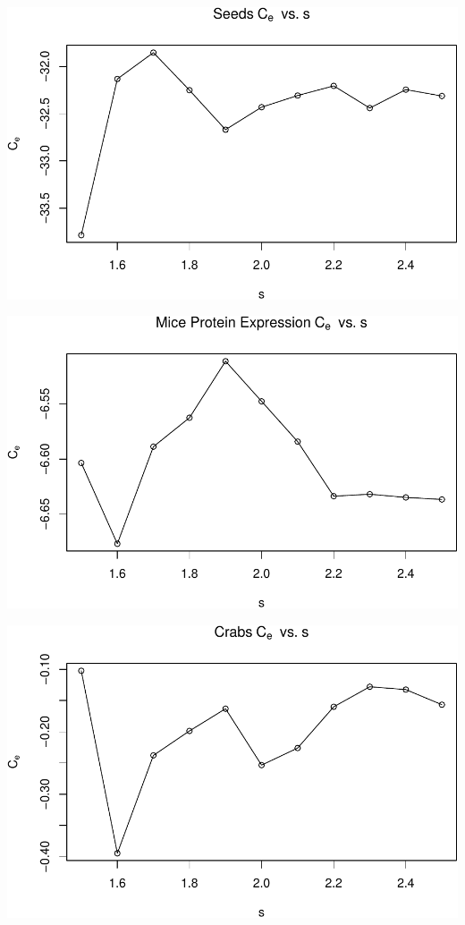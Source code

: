 \begin{center}\includegraphics[width=1\linewidth]{Report_files/figure-latex/unnamed-chunk-24-5} \end{center}

\begin{center}\includegraphics[width=1\linewidth]{Report_files/figure-latex/unnamed-chunk-24-6} \end{center}

\begin{center}\includegraphics[width=1\linewidth]{Report_files/figure-latex/unnamed-chunk-24-7} \end{center}


